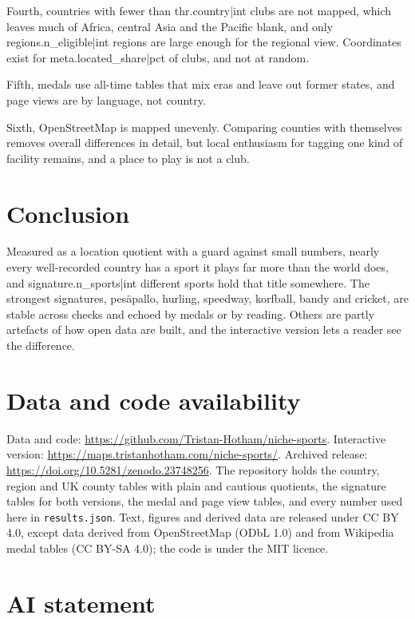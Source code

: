 \documentclass[11pt,a4paper]{article}
\begin{document}
Fourth, countries with fewer than {{thr.country|int}} clubs are not mapped, which leaves much of Africa, central Asia and the Pacific blank, and only {{regions.n_eligible|int}} regions are large enough for the regional view. Coordinates exist for {{meta.located_share|pct}} of clubs, and not at random.

Fifth, medals use all-time tables that mix eras and leave out former states, and page views are by language, not country.

Sixth, OpenStreetMap is mapped unevenly. Comparing counties with themselves removes overall differences in detail, but local enthusiasm for tagging one kind of facility remains, and a place to play is not a club.

\section{Conclusion}

Measured as a location quotient with a guard against small numbers, nearly every well-recorded country has a sport it plays far more than the world does, and {{signature.n_sports|int}} different sports hold that title somewhere. The strongest signatures, pesäpallo, hurling, speedway, korfball, bandy and cricket, are stable across checks and echoed by medals or by reading. Others are partly artefacts of how open data are built, and the interactive version lets a reader see the difference.

\section*{Data and code availability}

Data and code: \url{https://github.com/Tristan-Hotham/niche-sports}. Interactive version: \url{https://maps.tristanhotham.com/niche-sports/}. Archived release: \url{https://doi.org/10.5281/zenodo.23748256}. The repository holds the country, region and UK county tables with plain and cautious quotients, the signature tables for both versions, the medal and page view tables, and every number used here in \texttt{results.json}. Text, figures and derived data are released under CC BY 4.0, except data derived from OpenStreetMap (ODbL 1.0) and from Wikipedia medal tables (CC BY-SA 4.0); the code is under the MIT licence.

\section*{AI statement}
\end{document}
